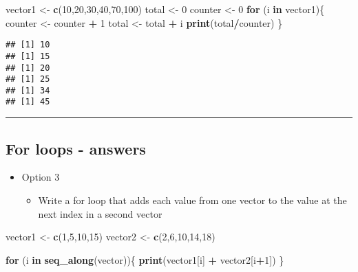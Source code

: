 \documentclass[]{article}
\newenvironment{Shaded}{\begin{snugshade}}{\end{snugshade}}
\newcommand{\ControlFlowTok}[1]{\textcolor[rgb]{0.13,0.29,0.53}{\textbf{#1}}}
\newcommand{\DecValTok}[1]{\textcolor[rgb]{0.00,0.00,0.81}{#1}}
\newcommand{\KeywordTok}[1]{\textcolor[rgb]{0.13,0.29,0.53}{\textbf{#1}}}
\newcommand{\NormalTok}[1]{#1}
\newcommand{\OperatorTok}[1]{\textcolor[rgb]{0.81,0.36,0.00}{\textbf{#1}}}
\newcommand{\StringTok}[1]{\textcolor[rgb]{0.31,0.60,0.02}{#1}}
\providecommand{\tightlist}{%
  \setlength{\itemsep}{0pt}\setlength{\parskip}{0pt}}
\begin{document}
\begin{Shaded}
\begin{Highlighting}[]
\NormalTok{vector1 <-}\StringTok{ }\KeywordTok{c}\NormalTok{(}\DecValTok{10}\NormalTok{,}\DecValTok{20}\NormalTok{,}\DecValTok{30}\NormalTok{,}\DecValTok{40}\NormalTok{,}\DecValTok{70}\NormalTok{,}\DecValTok{100}\NormalTok{)}
\NormalTok{total <-}\StringTok{ }\DecValTok{0}
\NormalTok{counter <-}\StringTok{ }\DecValTok{0}
\ControlFlowTok{for}\NormalTok{ (i }\ControlFlowTok{in}\NormalTok{ vector1)\{}
\NormalTok{  counter <-}\StringTok{ }\NormalTok{counter }\OperatorTok{+}\StringTok{ }\DecValTok{1}
\NormalTok{  total <-}\StringTok{ }\NormalTok{total }\OperatorTok{+}\StringTok{ }\NormalTok{i}
 \KeywordTok{print}\NormalTok{(total}\OperatorTok{/}\NormalTok{counter)}
\NormalTok{\}}
\end{Highlighting}
\end{Shaded}

\begin{verbatim}
## [1] 10
## [1] 15
## [1] 20
## [1] 25
## [1] 34
## [1] 45
\end{verbatim}

\begin{center}\rule{0.5\linewidth}{\linethickness}\end{center}

\hypertarget{for-loops---answers-2}{%
\subsection{For loops - answers}\label{for-loops---answers-2}}

\begin{itemize}
\tightlist
\item
  Option 3

  \begin{itemize}
  \tightlist
  \item
    Write a for loop that adds each value from one vector to the value
    at the next index in a second vector
  \end{itemize}
\end{itemize}

\begin{Shaded}
\begin{Highlighting}[]
\NormalTok{vector1 <-}\StringTok{ }\KeywordTok{c}\NormalTok{(}\DecValTok{1}\NormalTok{,}\DecValTok{5}\NormalTok{,}\DecValTok{10}\NormalTok{,}\DecValTok{15}\NormalTok{)}
\NormalTok{vector2 <-}\StringTok{ }\KeywordTok{c}\NormalTok{(}\DecValTok{2}\NormalTok{,}\DecValTok{6}\NormalTok{,}\DecValTok{10}\NormalTok{,}\DecValTok{14}\NormalTok{,}\DecValTok{18}\NormalTok{)}

\ControlFlowTok{for}\NormalTok{ (i }\ControlFlowTok{in} \KeywordTok{seq_along}\NormalTok{(vector))\{}
  \KeywordTok{print}\NormalTok{(vector1[i] }\OperatorTok{+}\StringTok{ }\NormalTok{vector2[i}\OperatorTok{+}\DecValTok{1}\NormalTok{])}
\NormalTok{\}}
\end{Highlighting}
\end{Shaded}
\end{document}
